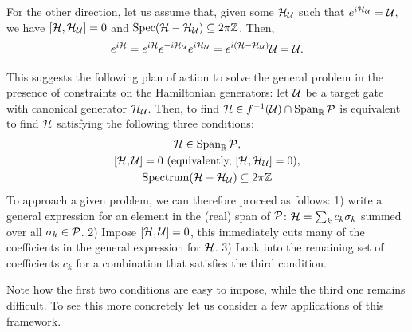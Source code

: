 For the other direction, let us assume that, given some ${\mathcal{H}}_{{\mathcal{U}}}$ such that $e^{i{\mathcal{H}}_{{\mathcal{U}}}}={\mathcal{U}}$, we have $[{\mathcal{H}},{\mathcal{H}}_{{\mathcal{U}}}]=0$ and $\operatorname{Spec}({\mathcal{H}}-{\mathcal{H}}_{{\mathcal{U}}})\subseteq2\pi{\mathbb{Z}}$.
Then,
\begin{equation}
    e^{i{\mathcal{H}}} =
    e^{i{\mathcal{H}}} e^{-i{\mathcal{H}}_{{\mathcal{U}}}} e^{i{\mathcal{H}}_{{\mathcal{U}}}} =
    e^{i({\mathcal{H}}-{\mathcal{H}}_{{\mathcal{U}}})} {\mathcal{U}} =
    {\mathcal{U}}.
\end{equation}

This suggests the following plan of action to solve the general problem in the presence of constraints on the Hamiltonian generators: let ${\mathcal{U}}$ be a target gate with canonical generator ${\mathcal{H}}_{{\mathcal{U}}}$. Then, to find ${\mathcal{H}}\in f^{-1}({\mathcal{U}})\cap\operatorname{Span}_{\mathbb{R}}{\mathcal{P}}$ is equivalent to find ${\mathcal{H}}$ satisfying the following three conditions:
\begin{subequations}
\begin{gather}
    \calH\in\on{Span}_\RR\calP, \label{eq:GL:3conditions_1st}\\
    [\calH,\calU]=0 \text{ (equivalently, $[\calH,\calH_{\calU}]=0$)},
    \label{eq:GL:3conditions_2nd}\\
    \on{Spectrum}(\calH-\calH_{\calU})\subseteq2\pi\ZZ \label{eq:GL:3conditions_3rd}
\end{gather}
\label{eq:GL:3conditions}
\end{subequations}
To approach a given problem, we can therefore proceed as follows:
1) write a general expression for an element in the (real) span of ${\mathcal{P}}$: ${\mathcal{H}}=\sum_k c_k \sigma_k$ summed over all $\sigma_k\in{\mathcal{P}}$.
2) Impose $[{\mathcal{H}},{\mathcal{U}}]=0$, this immediately cuts many of the coefficients in the general expression for ${\mathcal{H}}$.
3) Look into the remaining set of coefficients $c_k$ for a combination that satisfies the third condition.

Note how the first two conditions are easy to impose, while the third one remains difficult. To see this more concretely let us consider a few applications of this framework.

